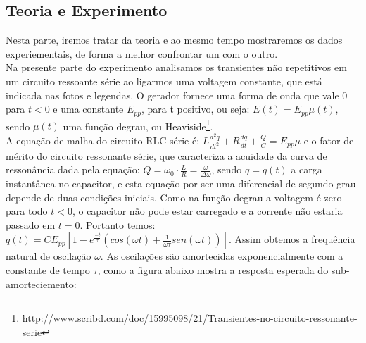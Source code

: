 \documentclass[12pt,letterpaper]{article}
\begin{document}
\subsection{Teoria e Experimento}
Nesta parte, iremos tratar da teoria e ao mesmo tempo mostraremos os dados experiementais, de forma a melhor confrontar um com o outro.\\
Na presente parte do experimento analisamos os transientes não repetitivos em um circuito ressoante série ao ligarmos uma voltagem constante, que está indicada nas fotos e legendas. O gerador fornece uma forma de onda que vale 0 para $t < 0$ e uma constante $E_{pp}$, para t positivo, ou seja: $E(t) = E_{pp}\mu (t)$, sendo $\mu (t)$ uma função degrau, ou Heaviside\footnote{\url{http://www.scribd.com/doc/15995098/21/Transientes-no-circuito-ressonante-serie}}.\\
A equação de malha do circuito RLC série é: $ L \frac{d^2q}{dt^2} + R\frac{dq}{dt} +\frac{Q}{C} = E_{pp}\mu$ e o fator de mérito do circuito ressonante série, que caracteriza a acuidade da curva de ressonância dada pela equação: $ Q = \omega_0 \cdot \frac{L}{R} = \frac{\omega}{\Delta \omega}$, sendo $q = q(t)$ a carga instantânea no capacitor, e esta equação por ser uma diferencial de segundo grau depende de duas condições iniciais. Como na função degrau a voltagem é zero para todo $t < 0$, o capacitor não pode estar carregado e a corrente não estaria passado em $t = 0$. Portanto temos: $ q(t) = C E_{pp}[1 - e^{\frac{-t}{\tau}}(cos(\omega t) + \frac{1}{\omega \tau}sen(\omega t))]$. Assim obtemos a frequência natural de oscilação $\omega$. As oscilações são amortecidas exponencialmente com a constante de tempo $\tau$, como a figura abaixo mostra a resposta esperada do sub-amorteciemento:
\end{document}
